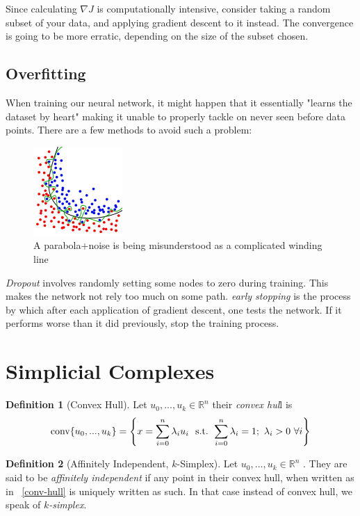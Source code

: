 \documentclass{article}
\newcommand{\R}{\mathbb{R}}
\newcommand{\conv}{\textmd{conv}}
\newcommand{\st}{\textmd{ s.t. }}
\theoremstyle{plain}
\theoremstyle{definition}
\newtheorem{definition}{Definition}[section]
\theoremstyle{remark}
\begin{document}
	Since calculating $\nabla J$ is computationally intensive, consider taking a random subset of your data, and applying gradient descent to it instead. The convergence is going to be more erratic, depending on the size of the subset chosen.
	\subsection{Overfitting}
	When training our neural network, it might happen that it essentially "learns the dataset by heart" making it unable to properly tackle on never seen before data points. There are a few methods to avoid such a problem:
		\begin{figure}[ht!]
		\centering
		\includegraphics{overfitting.png}
		\caption[image of overfitting]{A parabola+noise is being misunderstood as a complicated winding line \protect \footnotemark}
		\end{figure}
		
	\emph{Dropout} involves randomly setting some nodes to zero during training. This makes the network not rely too much on some path.
	\emph{early stopping} is the process by which after each application of gradient descent, one tests the network. If it performs worse than it did previously, stop the training process.	
	
	\section{Simplicial Complexes}
	\begin{definition}[Convex Hull]
	Let $ u_0,...,u_k \in \R^n $ their \emph{convex hul}l is
	  \begin{equation} 
	  \label{conv-hull}
	  \conv \{u_0,...,u_k\} = \left\{ x= \sum_{i=0}^{n} \lambda_i u_i \ \st    \sum_{i=0}^{n} \lambda_i = 1; \ \lambda_i > 0 \ \forall i \right\} 
	  \end{equation}
	\end{definition}
	
	\begin{definition}[Affinitely Independent, $k$-Simplex]
		Let $u_0,...,u_k \in \R^n$ . They are said to be \emph{affinitely independent }if any point in their convex hull, when written as in ~\eqref{conv-hull} is uniquely written as such.
		In that case instead of convex hull, we speak of \emph{$k$-simplex}.
	\end{definition}
	
\end{document}
